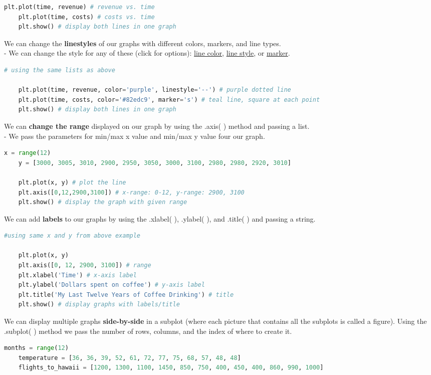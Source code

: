 \documentclass[11pt, a4paper]{article}
\begin{document}
\begin{spacing}{1.1}
\begin{lstlisting}[language=Python]
	plt.plot(time, revenue) # revenue vs. time
	plt.plot(time, costs) # costs vs. time
	plt.show() # display both lines in one graph \end{lstlisting}\vspace*{1mm}
	We can change the \textbf{linestyles} of our graphs with different colors, markers, and line types. \\
	\hspace*{3mm} - We can change the style for any of these (click for options): \href{https://www.w3schools.com/colors/colors_names.asp}{line color}, \href{https://matplotlib.org/3.1.0/gallery/lines_bars_and_markers/linestyles.html}{line style}, or \href{https://matplotlib.org/api/markers_api.html}{marker}.
	\begin{lstlisting}[language=Python]
	# using the same lists as above
	
	plt.plot(time, revenue, color='purple', linestyle='--') # purple dotted line
	plt.plot(time, costs, color='#82edc9', marker='s') # teal line, square at each point
	plt.show() # display both lines in one graph \end{lstlisting}\vspace*{1mm}
	We can \textbf{change the range} displayed on our graph by using the .axis( ) method and passing a list. \\
	\hspace*{3mm} - We pass the parameters for min/max x value and min/max y value four our graph.
	\begin{lstlisting}[language=Python]
	x = range(12)
	y = [3000, 3005, 3010, 2900, 2950, 3050, 3000, 3100, 2980, 2980, 2920, 3010]
	
	plt.plot(x, y) # plot the line
	plt.axis([0,12,2900,3100]) # x-range: 0-12, y-range: 2900, 3100
	plt.show() # display the graph with given range \end{lstlisting}\vspace*{1mm}
	We can add \textbf{labels} to our graphs by using the .xlabel( ), .ylabel( ), and .title( ) and passing a string.
	\begin{lstlisting}[language=Python]
	#using same x and y from above example
	
	plt.plot(x, y)
	plt.axis([0, 12, 2900, 3100]) # range
	plt.xlabel('Time') # x-axis label
	plt.ylabel('Dollars spent on coffee') # y-axis label
	plt.title('My Last Twelve Years of Coffee Drinking') # title
	plt.show() # display graphs with labels/title \end{lstlisting}\vspace*{1mm}
	We can display multiple graphs \textbf{side-by-side} in a subplot (where each picture that contains all the subplots is called a figure). Using the .subplot( ) method we pass the number of rows, columns, and the index of where to create it.
	\begin{lstlisting}[language=Python]
	months = range(12)
	temperature = [36, 36, 39, 52, 61, 72, 77, 75, 68, 57, 48, 48]
	flights_to_hawaii = [1200, 1300, 1100, 1450, 850, 750, 400, 450, 400, 860, 990, 1000]
	

\end{lstlisting}
\end{spacing}
\end{document}
